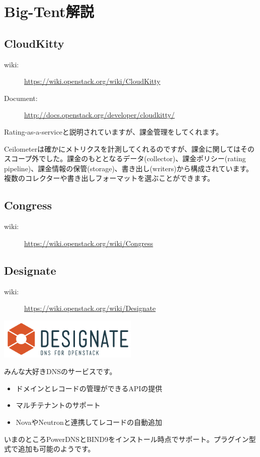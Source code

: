 \documentclass[10pt,b5paper,tombo,openany]{jsbook}
\begin{document}
\chapter{Big-Tent解説}

\section{CloudKitty}
\begin{description}
	\item[wiki:] \url{https://wiki.openstack.org/wiki/CloudKitty}
	\item[Document:] \url{http://docs.openstack.org/developer/cloudkitty/}
\end{description}
Rating-as-a-serviceと説明されていますが、課金管理をしてくれます。

Ceilometerは確かにメトリクスを計測してくれるのですが、課金に関してはそのスコープ外でした。課金のもととなるデータ(collector)、課金ポリシー(rating pipeline)、課金情報の保管(storage)、書き出し(writers)から構成されています。複数のコレクターや書き出しフォーマットを選ぶことができます。

\section{Congress}
\begin{description}
	\item[wiki:] \url{https://wiki.openstack.org/wiki/Congress}
\end{description}

\section{Designate}
\begin{description}
	\item[wiki:] \url{https://wiki.openstack.org/wiki/Designate}
\end{description}

\includegraphics[width=0.5\textwidth]{img/logo-designate.pdf}

みんな大好きDNSのサービスです。
\begin{itemize}
	\item ドメインとレコードの管理ができるAPIの提供
	\item マルチテナントのサポート
	\item NovaやNeutronと連携してレコードの自動追加
\end{itemize}
いまのところPowerDNSとBIND9をインストール時点でサポート。プラグイン型式で追加も可能のようです。
\end{document}
